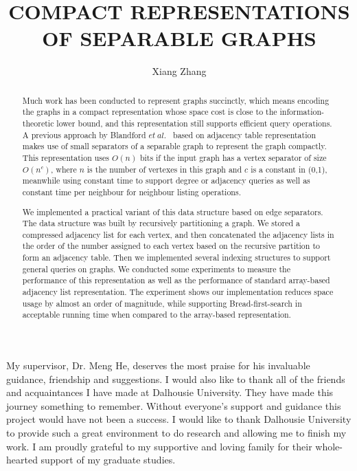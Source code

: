\documentclass[12pt,glossary]{dalthesis}
\begin{document}
\macs  %
\title{COMPACT REPRESENTATIONS OF SEPARABLE GRAPHS}
\author{Xiang Zhang}





\frontmatter





\begin{abstract}
Much work has been conducted to represent graphs succinctly, which means encoding the graphs in a compact representation whose space cost is close to the information-theoretic lower bound, and this representation still supports efficient query operations. A previous approach by Blandford $et \ al.$~\cite{compact-representation} based on adjacency table representation makes use of small separators of a separable graph to represent the graph compactly. This representation uses $O(n)$ bits if the input graph has a vertex separator of size $O(n^{c})$, where $n$ is the number of vertexes in this graph and $c$ is a constant in (0,1), meanwhile using constant time to support degree or adjacency queries as well as constant time per neighbour for neighbour listing operations.


We implemented a practical variant of this data structure based on edge separators. The data structure was built by recursively partitioning a graph. We stored a compressed adjacency list for each vertex, and then concatenated the adjacency lists in the order of the number assigned to each vertex based on the recursive partition to form an adjacency table. Then we implemented several indexing structures to support general queries on graphs. We conducted some experiments to measure the performance of this representation as well as the performance of standard array-based adjacency list representation. The experiment shows our implementation reduces space usage by almost an order of magnitude, while supporting Bread-first-search in acceptable running time when compared to the array-based representation.
\end{abstract}

\printglossary

\begin{acknowledgements}
My supervisor, Dr. Meng He, deserves the most praise for his invaluable guidance, friendship and suggestions. I would also like to thank all of the friends and acquaintances I have made at Dalhousie University. They have made this journey something to remember. Without everyone’s support and guidance this project would have not been a success.
I would like to thank Dalhousie University to provide such a great environment
to do research and allowing me to finish my work.
I am proudly grateful to my supportive and loving family for their whole-hearted
support of my graduate studies.
\end{acknowledgements}
\end{document}
